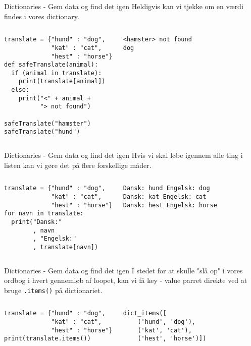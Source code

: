 \begin{frame}[fragile]{Dictionaries - Gem data og find det igen}
	Heldigvis kan vi tjekke om en værdi findes i vores dictionary.
	\begin{columns}
		\begin{lstlisting}[style=python]
translate = {"hund" : "dog", 
             "kat" : "cat", 
             "hest" : "horse"}
def safeTranslate(animal):
  if (animal in translate):
    print(translate[animal])
  else:
    print("<" + animal + 
          "> not found")
		
safeTranslate("hamster")
safeTranslate("hund")
		\end{lstlisting}

		\pause
		\begin{lstlisting}[style=python]
<hamster> not found
dog
		\end{lstlisting}
	\end{columns}	
\end{frame}

\begin{frame}[fragile]{Dictionaries - Gem data og find det igen}
	Hvis vi skal løbe igennem alle ting i listen kan vi gøre det på flere forskellige måder.
	\begin{columns}
		\column{0.5\textwidth}
		\begin{lstlisting}[style=python]
translate = {"hund" : "dog", 
             "kat" : "cat", 
             "hest" : "horse"}
for navn in translate:
  print("Dansk:"
        , navn 
        , "Engelsk:"
        , translate[navn])
		\end{lstlisting}
		
		\pause
		\column{0.45\textwidth}
		\begin{lstlisting}[style=python]
Dansk: hund Engelsk: dog
Dansk: kat Engelsk: cat
Dansk: hest Engelsk: horse
		\end{lstlisting}
	\end{columns}	
\end{frame}

\begin{frame}[fragile]{Dictionaries - Gem data og find det igen}
	I stedet for at skulle "slå op" i vores ordbog i hvert gennemløb af loopet, kan vi få key - value parret direkte ved at bruge \texttt{.items()} på dictionariet.
	\begin{columns}
		\column{0.55\textwidth}
		\begin{lstlisting}[style=python]
translate = {"hund" : "dog", 
             "kat" : "cat", 
             "hest" : "horse"}
print(translate.items())
		\end{lstlisting}
		
		\pause
		\column{0.44\textwidth}
		\begin{lstlisting}[style=python]
dict_items([
	('hund', 'dog'), 
	('kat', 'cat'), 
	('hest', 'horse')])
		\end{lstlisting}
	\end{columns}	
\end{frame}

